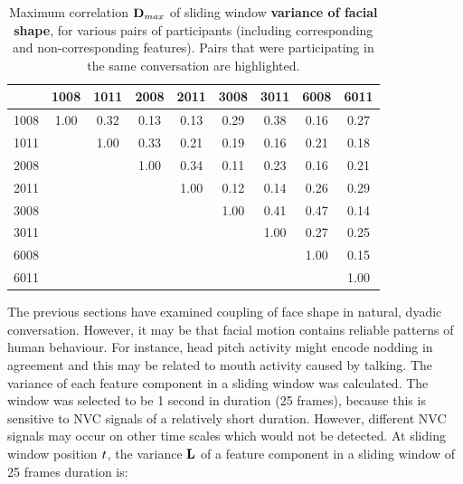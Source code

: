 \begin{table}[tb]
\centering
\caption[Maximum correlation $\dyadicCorrelation_{max}$ of sliding window \textbf{variance of facial shape}, for various pairs of participants (including corresponding and non-corresponding features).]{Maximum correlation $\dyadicCorrelation_{max}$ of sliding window \textbf{variance of facial shape}, for various pairs of participants (including corresponding and non-corresponding features). Pairs that were participating in the same conversation are highlighted.}
\begin{tabular}{ | c | c | c | c | c | c | c | c | c |}
\hline
& 1008 & 1011 & 2008 & 2011 & 3008 & 3011 & 6008 & 6011 \\
\hline
1008 & \cellcolor{orange} 1.00& \cellcolor{orange} 0.32& 0.13& 0.13& 0.29& 0.38& 0.16& 0.27\\
1011 & \cellcolor{orange} & \cellcolor{orange}1.00& 0.33& 0.21& 0.19& 0.16& 0.21& 0.18\\
2008 & & & \cellcolor{orange} 1.00& \cellcolor{orange}0.34& 0.11& 0.23&0.16 &0.21 \\
2011 & & & \cellcolor{orange} & \cellcolor{orange}1.00 & 0.12& 0.14& 0.26& 0.29\\
3008 & & & & & \cellcolor{orange}1.00& \cellcolor{orange}0.41& 0.47& 0.14\\
3011 & & & & & \cellcolor{orange} & \cellcolor{orange}1.00& 0.27& 0.25\\
6008 & & & & & & & \cellcolor{orange}1.00&\cellcolor{orange} 0.15\\
6011 & & & & & & & \cellcolor{orange} & \cellcolor{orange}1.00\\
\hline
\end{tabular}
\label{TableBackchannelVar}
\end{table}

The previous sections have examined coupling of face shape in natural, dyadic conversation. However, it may be that facial motion contains reliable patterns of human behaviour. For instance, head pitch activity might encode nodding in agreement and this may be related to mouth activity caused by talking. The variance of each feature component in a sliding window was calculated. The window was selected to be 1 second in duration (25 frames), because this is sensitive to \ac{NVC} signals of a relatively short duration. However, different \ac{NVC} signals may occur on other time scales which would not be detected. At sliding window position $t$, the variance $\textbf{L}$ of a feature component in a sliding window of 25 frames duration is:

